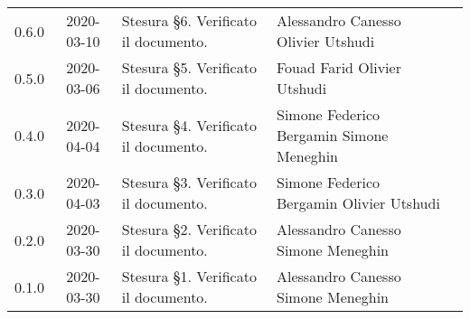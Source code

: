 {\begin{longtable}{ c c  C{4cm}  C{4cm}  C{3cm} }
		0.6.0 & 2020-03-10 & Stesura \S 6. Verificato il documento. & Alessandro Canesso \newline Olivier Utshudi &\Res{} \newline \ver{}\\
		0.5.0 & 2020-03-06 & Stesura \S 5. Verificato il documento.  & Fouad Farid \newline Olivier Utshudi &\Res{} \newline \ver{}\\
		0.4.0 & 2020-04-04 & Stesura \S 4. Verificato il documento. & Simone Federico Bergamin \newline Simone Meneghin &\adm{} \newline \ver{}\\	
		0.3.0 & 2020-04-03 & Stesura \S 3. Verificato il documento.  & Simone Federico Bergamin \newline Olivier Utshudi &\adm{} \newline \ver{}\\	
		0.2.0 & 2020-03-30 & Stesura \S 2. Verificato il documento.  & Alessandro Canesso \newline Simone Meneghin &\Res{} \newline \ver{}\\	
		0.1.0 & 2020-03-30 & Stesura \S 1. Verificato il documento. & Alessandro Canesso \newline Simone Meneghin &\Res{} \newline \ver{}\\		
	\end{longtable}
} 
